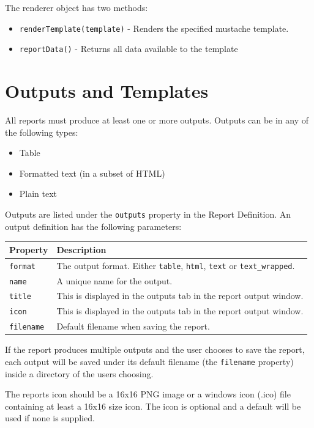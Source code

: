 \documentclass[a4paper,10pt]{book}
\begin{document}
The renderer object has two methods:
\begin{itemize}
\item \verb|renderTemplate(template)| - Renders the specified mustache template.
\item \verb|reportData()| - Returns all data available to the template
\end{itemize}

\chapter{Outputs and Templates}
All reports must produce at least one or more outputs. Outputs can be in any of the following types:
\begin{itemize}
\item Table
\item Formatted text (in a subset of HTML)
\item Plain text
\end{itemize}

Outputs are listed under the \verb|outputs| property in the Report Definition. An output definition has the following parameters:

\begin{tabular}{p{2.5cm} l}
\hline
\textbf{Property} & \textbf{Description} \\
\hline
\verb|format| & The output format. Either \verb|table|, \verb|html|, \verb|text| or \verb|text_wrapped|.\\
\verb|name| & A unique name for the output.\\
\verb|title| & This is displayed in the outputs tab in the report output window.\\
\verb|icon| & This is displayed in the outputs tab in the report output window.\\
\verb|filename| & Default filename when saving the report.\\
\hline
\end{tabular}

If the report produces multiple outputs and the user chooses to save the report, each output will be saved under its default filename (the \verb|filename| property) inside a directory of the users choosing.

The reports icon should be a 16x16 PNG image or a windows icon (.ico) file containing at least a 16x16 size icon. The icon is optional and a default will be used if none is supplied.
\end{document}
